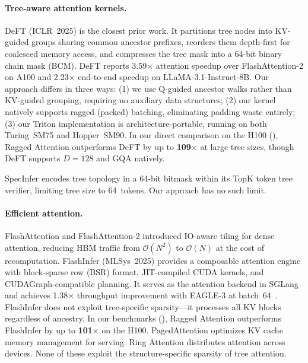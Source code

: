 \documentclass{article}
\newcommand{\method}{Ragged Attention}
\newcommand{\bigO}[1]{\mathcal{O}(#1)}
\newcommand{\headdim}{D}
\begin{document}
\paragraph{Tree-aware attention kernels.}
DeFT \cite{yao2024deft} (ICLR~2025) is the closest prior work.
It partitions tree nodes into KV-guided groups sharing common
ancestor prefixes, reorders them depth-first for coalesced memory
access, and compresses the tree mask into a 64-bit binary chain
mask (BCM).
DeFT reports 3.59$\times$ attention speedup over FlashAttention-2 on
A100 and 2.23$\times$ end-to-end speedup on LLaMA-3.1-Instruct-8B.
Our approach differs in three ways: (1) we use Q-guided ancestor walks
rather than KV-guided grouping, requiring no auxiliary data structures;
(2) our kernel natively supports ragged (packed) batching, eliminating
padding waste entirely; (3) our Triton implementation is
architecture-portable, running on both Turing~SM75 and Hopper~SM90.
In our direct comparison on the H100 (), \method{}
outperforms DeFT by up to \textbf{109$\times$} at large tree sizes,
though DeFT supports $\headdim = 128$ and GQA natively.

SpecInfer \cite{miao2024specinfer} encodes tree topology in a 64-bit
bitmask within its TopK token tree verifier, limiting tree size to
64~tokens.
Our approach has no such limit.

\paragraph{Efficient attention.}
FlashAttention \cite{dao2022flashattention} and FlashAttention-2
\cite{dao2023flashattention2} introduced IO-aware tiling for dense
attention, reducing HBM traffic from $\bigO{N^2}$ to $\bigO{N}$ at
the cost of recomputation.
FlashInfer \cite{ye2025flashinfer} (MLSys~2025) provides a
composable attention engine with block-sparse row (BSR) format,
JIT-compiled CUDA kernels, and CUDAGraph-compatible planning.
It serves as the attention backend in SGLang and achieves 1.38$\times$
throughput improvement with EAGLE-3 at batch~64~\cite{li2025eagle3}.
FlashInfer does not exploit tree-specific sparsity---it processes all
KV blocks regardless of ancestry.
In our benchmarks (), \method{} outperforms
FlashInfer by up to \textbf{101$\times$} on the H100.
PagedAttention \cite{kwon2023vllm} optimizes KV cache memory
management for serving.
Ring Attention \cite{liu2023ring} distributes attention across devices.
None of these exploit the structure-specific sparsity of tree attention.
\end{document}
